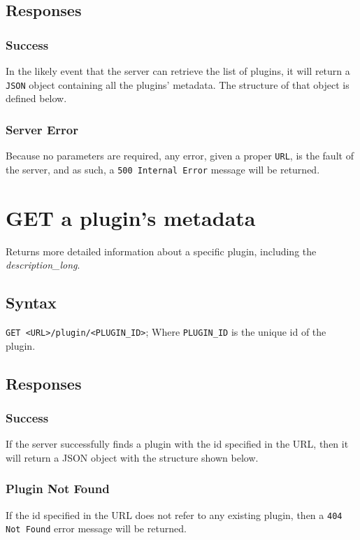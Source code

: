 \documentclass[a4paper, 12pt]{article}
\begin{document}
		\subsection{Responses}
			\subsubsection{Success}
				In the likely event that the server can retrieve the list of plugins, it will return a \verb|JSON| object containing all the plugins' metadata. The structure of that object is defined below.

				

			\subsubsection{Server Error}
				Because no parameters are required, any error, given a proper \verb|URL|, is the fault of the server, and as such, a \verb|500 Internal Error| message will be returned.

	\section{GET a plugin's metadata}
		Returns more detailed information about a specific plugin, including the \emph{description\_long}.

		\subsection{Syntax}
			\verb|GET <URL>/plugin/<PLUGIN_ID>|; \footnotesize{Where \verb|PLUGIN_ID| is the unique id of the plugin.}

		\subsection{Responses}
			\subsubsection{Success}
				If the server successfully finds a plugin with the id specified in the URL, then it will return a JSON object with the structure shown below.

				

			\subsubsection{Plugin Not Found}
				If the id specified in the URL does not refer to any existing plugin, then a \verb|404 Not Found| error message will be returned.
\end{document}
